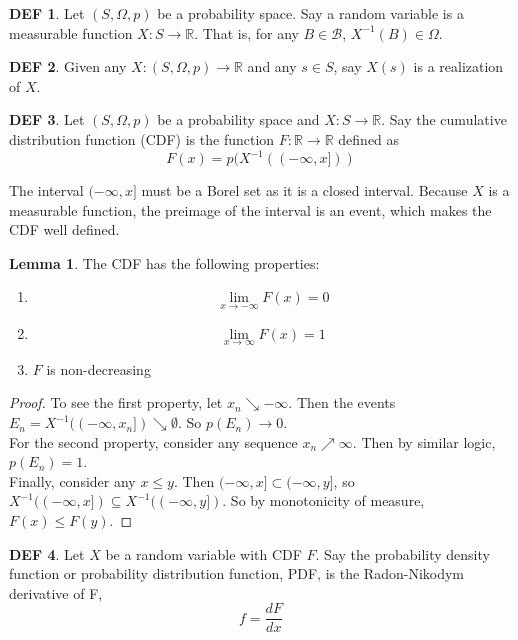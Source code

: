 \documentclass{article}
\theoremstyle{definition}\newtheorem{definition}{DEF}
\theoremstyle{definition}\newtheorem{example}{Ex}
\theoremstyle{lemma}\newtheorem{lemma}{Lemma}
\theoremstyle{corrolary}\newtheorem{corrolary}{Cor}
\begin{document}
\begin{definition}
Let $(S, \Omega, p)$ be a probability space.
Say a random variable is a measurable function $X: S \rightarrow \mathbb{R}$.
That is, for any $B \in \mathcal{B}$, $X^{-1}(B) \in \Omega$.
\end{definition}

\begin{definition}
Given any $X: (S, \Omega, p) \rightarrow \mathbb{R}$ and any $s \in S$, say $X(s)$ is a realization of $X$.
\end{definition}

\begin{definition}
Let $(S, \Omega, p)$ be a probability space and $X: S \rightarrow \mathbb{R}$.
Say the cumulative distribution function (CDF) is the function $F: \mathbb{R} \rightarrow \mathbb{R}$ defined as
\begin{equation}
F(x) = p(X^{-1}((-\infty, x]))
\end{equation}
\end{definition}

The interval $(-\infty, x]$ must be a Borel set as it is a closed interval.
Because $X$ is a measurable function, the preimage of the interval is an event, which makes the CDF well defined.

\begin{lemma}
The CDF has the following properties:
\begin{enumerate}
\item
 $$\lim_{x\to-\infty} F(x)  = 0$$

\item 
$$\lim_{x\to\infty}F(x) = 1$$
\item $F$ is non-decreasing
\end{enumerate}
\end{lemma}
\begin{proof}
To see the first property, let $x_n \searrow -\infty$.
Then the events $E_n = X^{-1}((-\infty, x_n]) \searrow \emptyset$.
So $p(E_n) \rightarrow 0$. \\
For the second property, consider any sequence $x_n \nearrow \infty$.
Then by similar logic, $p(E_n) = 1$. \\
Finally, consider any $x \leq y$.
Then $(-\infty, x] \subset (-\infty, y]$, so $X^{-1}((-\infty, x]) \subseteq X^{-1}((-\infty, y])$.
So by monotonicity of measure, $F(x) \leq F(y)$.
\end{proof}

\begin{definition}
Let $X$ be a random variable with CDF $F$.
Say the probability density function or probability distribution function, PDF, is the Radon-Nikodym derivative of F,
$$ f = \frac{dF}{dx}$$
\end{definition}
\end{document}
